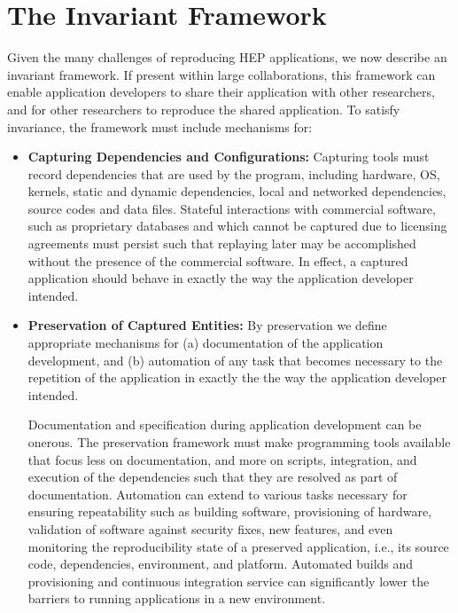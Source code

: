 \section{The Invariant Framework}

Given the many challenges of reproducing HEP applications, we now describe an invariant framework. If present within large collaborations, this framework can enable application developers to share their 
application with other researchers, and for other researchers to reproduce the shared application. 
To satisfy invariance, the framework must include mechanisms for:

\begin{itemize}

\item {\bf Capturing Dependencies and Configurations:} 
Capturing tools must record dependencies that are used by the program, including hardware, OS, kernels, static and dynamic dependencies, local and networked dependencies, source codes and data files. Stateful interactions with commercial software, such as proprietary databases and which cannot be captured due to licensing agreements must persist such that replaying later may be accomplished without the presence of the commercial software. In effect, a captured application should behave in exactly the way the application developer intended.

\item{\bf Preservation of Captured Entities:} By preservation we define appropriate mechanisms for (a) documentation of the application development, and (b) automation of any task that becomes necessary to the repetition of the application in exactly the the way the application developer intended.

Documentation and specification during application development can be onerous. The preservation framework must make programming tools available that focus less on documentation, and more on scripts, integration, and execution of the dependencies such that they are resolved as part of documentation. Automation can extend to various tasks necessary for ensuring repeatability such as building software, provisioning of hardware, validation of software against security fixes, new features, and even monitoring the reproducibility state of a preserved application, i.e., its source code, dependencies, environment, and platform. Automated builds and provisioning and continuous integration service can significantly lower the barriers to running applications in a new environment.


\end{itemize}
